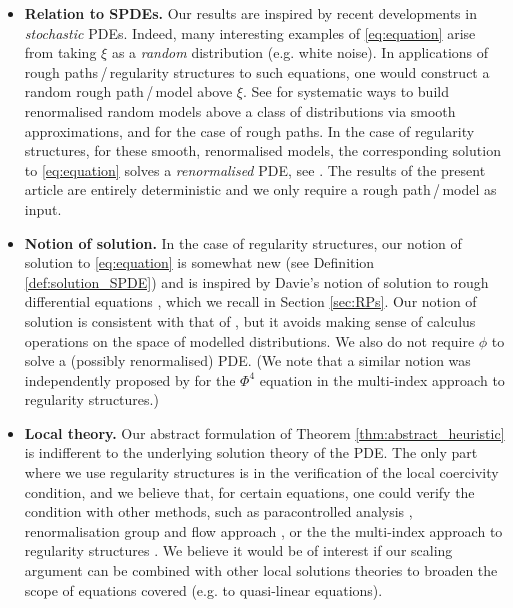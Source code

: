 \documentclass[11pt,a4paper]{article}
\numberwithin{equation}{section}
\theoremstyle{definition}
\theoremstyle{remark}
\begin{document}
\begin{itemize}
\item \textbf{Relation to SPDEs.} Our results are inspired by recent developments in \emph{stochastic} PDEs.
Indeed, many interesting examples of \eqref{eq:equation} arise from taking $\xi$ as a \emph{random} distribution (e.g. white noise).
In applications of rough paths\,/\,regularity structures to such equations, one would construct a random rough path\,/\,model above $\xi$.
See \cite{CH16,LOTT24,HS23_BPHZ} for systematic ways to build renormalised random models above a class of distributions via smooth approximations, and \cite{FV10,FrizHairer20} for the case of rough paths.
In the case of regularity structures, for these smooth, renormalised models, the corresponding solution to \eqref{eq:equation} solves a \emph{renormalised} PDE,
see \cite{BCCH21}.
The results of the present article are entirely deterministic and we only require a rough path\,/\,model as input.

  \item \textbf{Notion of solution.}
  In the case of regularity structures, our notion of solution to \eqref{eq:equation} is somewhat new (see Definition \ref{def:solution_SPDE})
  and is inspired by Davie's notion of solution to rough differential equations \cite{Davie_08}, which we recall in Section \ref{sec:RPs}.
  Our notion of solution is consistent with that of \cite{Hairer14}, but it avoids making sense of calculus operations on the space of modelled distributions.
  We also do not require $\phi$ to solve a (possibly renormalised) PDE.
  (We note that a similar notion was independently proposed by \cite{BOS_25_Phi4} for the $\Phi^4$ equation in the multi-index approach to regularity structures.)

  \item \textbf{Local theory.}
  Our abstract formulation of Theorem \ref{thm:abstract_heuristic} is indifferent to the underlying solution theory of the PDE.
  The only part where we use regularity structures is in the verification of the local coercivity condition,
  and we believe that, for certain equations,
  one could verify the condition with other methods, such as paracontrolled analysis \cite{GIP15}, renormalisation group and flow approach \cite{Kupiainen2016,Duch25_flow},
  or the the multi-index approach to regularity structures \cite{OW19,LOT23,OSSW25_a_priori}.
  We believe it would be of interest if our scaling argument can be combined with other local solutions theories to broaden the scope of equations covered (e.g. to quasi-linear equations).


\end{itemize}
\end{document}
